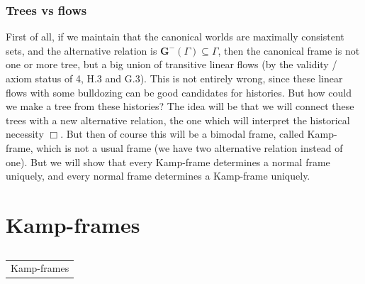 \documentclass[xcolor=x11names]{beamer}
\makeatletter
\let\beamer@writeslidentry@miniframeson=\beamer@writeslidentry
\def\beamer@writeslidentry@miniframesoff{%
  \expandafter\beamer@ifempty\expandafter{\beamer@framestartpage}{}%
  {%
    \clearpage\beamer@notesactions%
  }
}
\newcommand*{\miniframeson}{\let\beamer@writeslidentry=\beamer@writeslidentry@miniframeson}
\newcommand*{\miniframesoff}{\let\beamer@writeslidentry=\beamer@writeslidentry@miniframesoff}
\newcommand{\cimdia}[1] {\miniframesoff \begin{frame}\begin{center}\huge \begin{tabular}{c}#1\end{tabular}\end{center}\end{frame}\miniframeson}
\newcommand{\szakasz}[2][]{\section{#1}\subsection{}\cimdia{#2}}
\newcommand{\FB}{\mathbf G}
\makeatother
\begin{document}
\begin{frame}
	\frametitle{Trees vs flows}

First of all, if we maintain that the canonical worlds are maximally consistent sets, and the
alternative relation is $\FB^-(\Gamma) \subseteq \Gamma$, then the canonical frame is not one or more tree, but a big union of transitive linear flows (by the validity / axiom status of 4, H.3 and G.3). This is not entirely wrong, since these linear flows with some bulldozing can be good candidates for histories. But how could we make a tree from these histories? The idea will be that we will connect these trees with a new alternative relation, the one which will interpret the historical necessity $\Box$. But then of course this will be a bimodal frame, called Kamp-frame, which is not a usual frame (we have two alternative relation instead of one). But we will show that every Kamp-frame determines a normal frame uniquely, and every normal frame determines a Kamp-frame uniquely.

\end{frame}

\szakasz[Kamp-frames]{Kamp-frames}
\end{document}

